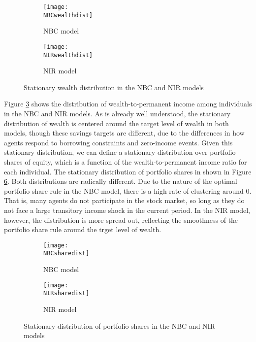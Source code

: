 \begin{figure}[h]
    \centering
    \begin{subfigure}{0.49\textwidth}
        \centering
        \texttt{[image: \\NBCwealthdist]}
        \caption{NBC model}
        \label{subfig:NBCwealthdist}
    \end{subfigure}
    \begin{subfigure}{0.49\textwidth}
        \centering
        \texttt{[image: \\NIRwealthdist]}
        \caption{NIR model}
        \label{subfig:NIRwealthdist}
    \end{subfigure}
    \caption{Stationary wealth distribution in the NBC and NIR models}
    \label{fig:wealthdist}
\end{figure}
Figure \ref{fig:wealthdist} shows the distribution of wealth-to-permanent income among individuals in the NBC and NIR models. As is already well understood, the stationary distribution of wealth is centered around the target level of wealth in both models, though these savings targets are different, due to the differences in how agents respond to borrowing constraints and zero-income events. Given this stationary distribution, we can define a stationary distribution over portfolio shares of equity, which is a function of the wealth-to-permanent income ratio for each individual. The stationary distribution of portfolio shares in shown in Figure \ref{fig:sharedist}. Both distributions are radically different. Due to the nature of the optimal portfolio share rule in the NBC model, there is a high rate of clustering around 0. That is, many agents do not participate in the stock market, so long as they do not face a large transitory income shock in the current period. In the NIR model, however, the distribution is more spread out, reflecting the smoothness of the portfolio share rule around the trget level of wealth.
\begin{figure}[h]
    \centering
    \begin{subfigure}{0.49\textwidth}
        \centering
        \texttt{[image: \\NBCsharedist]}
        \caption{NBC model}
        \label{subfig:NBCsharedist}
    \end{subfigure}
    \begin{subfigure}{0.49\textwidth}
        \centering
        \texttt{[image: \\NIRsharedist]}
        \caption{NIR model}
        \label{subfig:NIRsharedist}
    \end{subfigure}
    \caption{Stationary distribution of portfolio shares in the NBC and NIR models}
    \label{fig:sharedist}
\end{figure}
